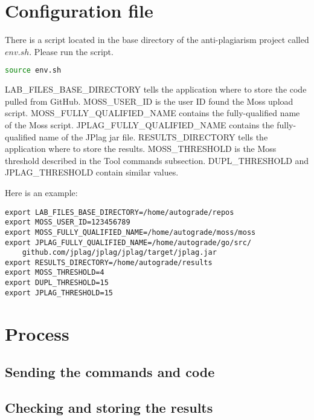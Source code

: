 \documentclass[12pt]{article}
\begin{document}
			
	\section{Configuration file}
		There is a script located in the base directory of the anti-plagiarism project called $env.sh$. Please run the script.
		\begin{lstlisting}[language=bash]
source env.sh
		\end{lstlisting}
		
		LAB\_FILES\_BASE\_DIRECTORY tells the application where to store the code pulled from GitHub. MOSS\_USER\_ID is the user ID found the Moss upload script. MOSS\_FULLY\_QUALIFIED\_NAME contains the fully-qualified name of the Moss script. JPLAG\_FULLY\_QUALIFIED\_NAME contains the fully-qualified name of the JPlag jar file. RESULTS\_DIRECTORY tells the application where to store the results. MOSS\_THRESHOLD is the Moss threshold described in the Tool commands subsection. DUPL\_THRESHOLD and JPLAG\_THRESHOLD contain similar values.
			
		Here is an example:
		\begin{lstlisting}
export LAB_FILES_BASE_DIRECTORY=/home/autograde/repos
export MOSS_USER_ID=123456789
export MOSS_FULLY_QUALIFIED_NAME=/home/autograde/moss/moss
export JPLAG_FULLY_QUALIFIED_NAME=/home/autograde/go/src/
	github.com/jplag/jplag/jplag/target/jplag.jar
export RESULTS_DIRECTORY=/home/autograde/results
export MOSS_THRESHOLD=4
export DUPL_THRESHOLD=15
export JPLAG_THRESHOLD=15
		\end{lstlisting}		

	\section{Process}
		
		\subsection{Sending the commands and code}
			
		\subsection{Checking and storing the results}
\end{document}
